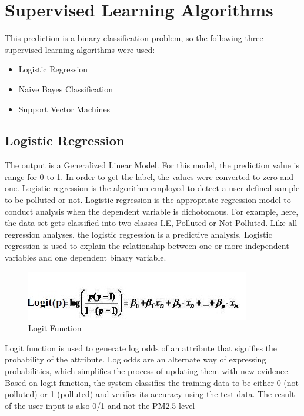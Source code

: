 \section{Supervised Learning Algorithms}
This prediction is a binary classification problem, so the following three supervised learning algorithms were used:

\begin{itemize}
\item{Logistic Regression}

	\item{Naive Bayes Classification}

	\item{Support Vector Machines}
	
\end{itemize}

\subsection{Logistic Regression }
The output is a Generalized Linear Model. For this model, the prediction value is range for 0 to 1. In order to get the label, the values were converted to zero  and one. Logistic regression is the algorithm employed to detect a user-defined sample to be polluted or not. Logistic regression is the appropriate regression model to conduct analysis when the dependent variable is dichotomous. For example, here, the data set gets classified into two classes I.E, Polluted or Not Polluted. Like all regression analyses, the logistic regression is a predictive analysis. Logistic regression is used to explain the relationship between one or more independent variables and one dependent binary variable.


\begin{figure}[h]
	\label{ss}    %
	\centering
	\includegraphics[width= 11 cm]{3.jpg}
	\caption{Logit Function}
\end{figure}

Logit function is used to generate log odds of an attribute that signifies the probability of the attribute. Log odds are an alternate way of expressing probabilities, which simplifies the process of updating them with new evidence.
Based on logit function, the system classifies the training data to be either 0 (not polluted) or 1 (polluted) and verifies its accuracy using the test data. The result of the user input is also 0/1 and not the PM2.5 level



